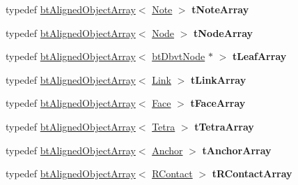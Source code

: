 \begin{DoxyCompactItemize}
\mbox{\label{classbtSoftBody_acad78fbeeb5f7724e91ff47e08f9ac5f}} 
typedef \hyperlink{classbtAlignedObjectArray}{bt\+Aligned\+Object\+Array}$<$ \hyperlink{structbtSoftBody_1_1Note}{Note} $>$ {\bfseries t\+Note\+Array}
\item 
\mbox{\label{classbtSoftBody_a8d19c9374c72022fc479c07e320aa2d4}} 
typedef \hyperlink{classbtAlignedObjectArray}{bt\+Aligned\+Object\+Array}$<$ \hyperlink{structbtSoftBody_1_1Node}{Node} $>$ {\bfseries t\+Node\+Array}
\item 
\mbox{\label{classbtSoftBody_ac257aa97c9ff3e1abf09e4a7f89a7cfa}} 
typedef \hyperlink{classbtAlignedObjectArray}{bt\+Aligned\+Object\+Array}$<$ \hyperlink{structbtDbvtNode}{bt\+Dbvt\+Node} $\ast$ $>$ {\bfseries t\+Leaf\+Array}
\item 
\mbox{\label{classbtSoftBody_a61dcb1cc5b3525c8e236ad12f15e2f68}} 
typedef \hyperlink{classbtAlignedObjectArray}{bt\+Aligned\+Object\+Array}$<$ \hyperlink{structbtSoftBody_1_1Link}{Link} $>$ {\bfseries t\+Link\+Array}
\item 
\mbox{\label{classbtSoftBody_a3cf3ffb65664de7a237e8ffe675ce38a}} 
typedef \hyperlink{classbtAlignedObjectArray}{bt\+Aligned\+Object\+Array}$<$ \hyperlink{structbtSoftBody_1_1Face}{Face} $>$ {\bfseries t\+Face\+Array}
\item 
\mbox{\label{classbtSoftBody_a2368a2f83a0418cccd30d227f41365d3}} 
typedef \hyperlink{classbtAlignedObjectArray}{bt\+Aligned\+Object\+Array}$<$ \hyperlink{structbtSoftBody_1_1Tetra}{Tetra} $>$ {\bfseries t\+Tetra\+Array}
\item 
\mbox{\label{classbtSoftBody_aa190e998c906fa88144c46b8f63c5db4}} 
typedef \hyperlink{classbtAlignedObjectArray}{bt\+Aligned\+Object\+Array}$<$ \hyperlink{structbtSoftBody_1_1Anchor}{Anchor} $>$ {\bfseries t\+Anchor\+Array}
\item 
\mbox{\label{classbtSoftBody_a34792e0b100695d18cb1515cb93b003e}} 
typedef \hyperlink{classbtAlignedObjectArray}{bt\+Aligned\+Object\+Array}$<$ \hyperlink{structbtSoftBody_1_1RContact}{R\+Contact} $>$ {\bfseries t\+R\+Contact\+Array}

\end{DoxyCompactItemize}
